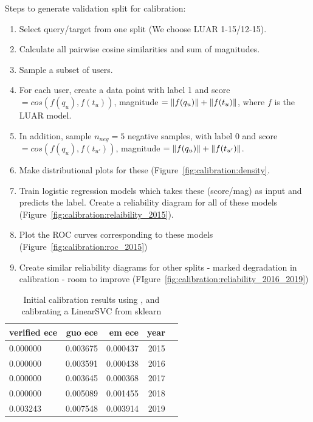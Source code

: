 \DSfixeddelta{}
Steps to generate validation split for calibration:
\begin{enumerate}
    \item Select query/target from one split (We choose LUAR 1-15/12-15).
    \item Calculate all pairwise cosine similarities and sum of magnitudes.
    \item Sample a subset of users.
    \item For each user, create a data point with label 1 and score $ = cos(f(q_{u}), f(t_{u}))$, magnitude $=\lVert f(q_{u})\rVert + \lVert f(t_{u})\rVert$, where $f$ is the LUAR model.
    \item In addition, sample $n_{neg} = 5$ negative samples, with label 0 and score $ = cos(f(q_{u}), f(t_{u'}))$, magnitude $=\lVert f(q_{u})\rVert + \lVert f(t_{u'})\rVert$.
    \item Make distributional plots for these (Figure~\ref{fig:calibration:density}.
    \item Train logistic regression models which takes these (score/mag) as input and predicts the label. Create a reliability diagram for all of these models (Figure~\ref{fig:calibration:relaibility_2015}).
    \item Plot the ROC curves corresponding to these models (Figure~\ref{fig:calibration:roc_2015})
    \item Create similar reliability diagrams for other splits - marked degradation in calibration - room to improve (FIgure~\ref{fig:calibration:reliability_2016_2019})
\end{enumerate}
\begin{table}[]
    \centering
\begin{tabular}{lrrrr}
\toprule
verified ece & guo ece & em ece & year \\
\midrule
 0.000000 & 0.003675 & 0.000437 & 2015 \\
 0.000000 & 0.003591 & 0.000438 & 2016 \\
 0.000000 & 0.003645 & 0.000368 & 2017 \\
 0.000000 & 0.005089 & 0.001455 & 2018 \\
 0.003243 & 0.007548 & 0.003914 & 2019 \\
 \bottomrule
\end{tabular}
    \caption{Initial calibration results using \cite{kumar2019verified}, and calibrating a LinearSVC from sklearn}
    \label{tab:calib:init}
\end{table}

